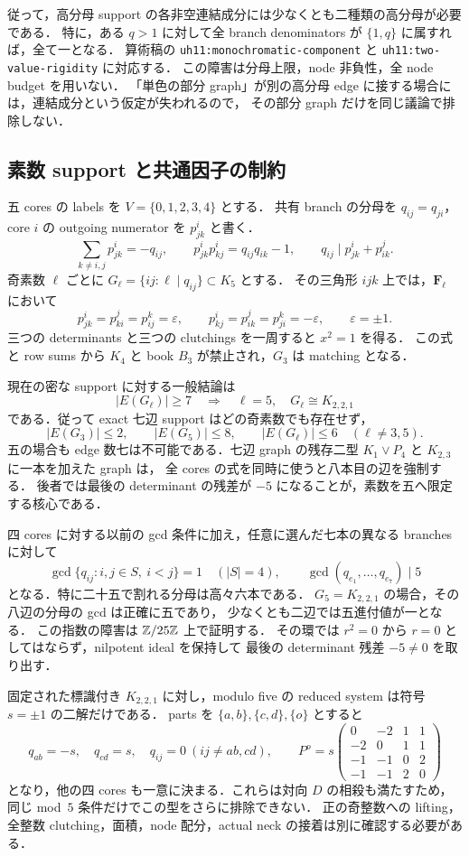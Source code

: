 従って，高分母 support の各非空連結成分には少なくとも二種類の高分母が必要である．
特に，ある $q>1$ に対して全 branch denominators が $\{1,q\}$ に属すれば，全て一となる．
算術稿の \texttt{uh11:monochromatic-component} と
\texttt{uh11:two-value-rigidity} に対応する．
この障害は分母上限，node 非負性，全 node budget を用いない．
「単色の部分 graph」が別の高分母 edge に接する場合には，連結成分という仮定が失われるので，
その部分 graph だけを同じ議論で排除しない．

\subsection{素数 support と共通因子の制約}

五 cores の labels を $V=\{0,1,2,3,4\}$ とする．
共有 branch の分母を $q_{ij}=q_{ji}$，core $i$ の outgoing numerator を $p^i_{jk}$ と書く．
\[
 \sum_{k\ne i,j}p^i_{jk}=-q_{ij},\qquad
 p^i_{jk}p^i_{kj}=q_{ij}q_{ik}-1,\qquad
 q_{ij}\mid p^i_{jk}+p^j_{ik}.
\]
奇素数 $\ell$ ごとに $G_\ell=\{ij:\ell\mid q_{ij}\}\subset K_5$ とする．
その三角形 $ijk$ 上では，$\mathbf F_\ell$ において
\[
 p^i_{jk}=p^j_{ki}=p^k_{ij}=\varepsilon,\qquad
 p^i_{kj}=p^j_{ik}=p^k_{ji}=-\varepsilon,
 \qquad\varepsilon=\pm1.
\]
三つの determinants と三つの clutchings を一周すると $x^2=1$ を得る．
この式と row sums から $K_4$ と book $B_3$ が禁止され，$G_3$ は matching となる．

現在の密な support に対する一般結論は
\[
 |E(G_\ell)|\geq7
 \quad\Longrightarrow\quad
 \ell=5,\quad G_\ell\cong K_{2,2,1}
\]
である．従って exact 七辺 support はどの奇素数でも存在せず，
\[
 |E(G_3)|\leq2,\qquad |E(G_5)|\leq8,\qquad
 |E(G_\ell)|\leq6\quad(\ell\ne3,5).
\]
五の場合も edge 数七は不可能である．七辺 graph の残存二型
$K_1\vee P_4$ と $K_{2,3}$ に一本を加えた graph は，
全 cores の式を同時に使うと八本目の辺を強制する．
後者では最後の determinant の残差が $-5$ になることが，素数を五へ限定する核心である．

四 cores に対する以前の gcd 条件に加え，任意に選んだ七本の異なる branches に対して
\[
 \gcd\{q_{ij}:i,j\in S,\ i<j\}=1\quad(|S|=4),
 \qquad
 \gcd(q_{e_1},\ldots,q_{e_7})\mid5
\]
となる．特に二十五で割れる分母は高々六本である．
$G_5=K_{2,2,1}$ の場合，その八辺の分母の gcd は正確に五であり，
少なくとも二辺では五進付値が一となる．
この指数の障害は $\mathbb Z/25\mathbb Z$ 上で証明する．
その環では $r^2=0$ から $r=0$ としてはならず，nilpotent ideal を保持して
最後の determinant 残差 $-5\ne0$ を取り出す．

固定された標識付き $K_{2,2,1}$ に対し，modulo five の reduced system は符号 $s=\pm1$ の二解だけである．
parts を $\{a,b\},\{c,d\},\{o\}$ とすると
\[
 q_{ab}=-s,\quad q_{cd}=s,\quad q_{ij}=0\ (ij\ne ab,cd),
 \qquad
 P^o=s\begin{pmatrix}
 0&-2&1&1\\-2&0&1&1\\-1&-1&0&2\\-1&-1&2&0
 \end{pmatrix}
\]
となり，他の四 cores も一意に決まる．これらは対向 $D$ の相殺も満たすため，
同じ mod~$5$ 条件だけでこの型をさらに排除できない．
正の奇整数への lifting，全整数 clutching，面積，node 配分，actual neck の接着は別に確認する必要がある．

